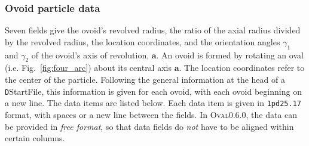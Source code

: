 \documentclass[letterpaper,11pt]{article}
\newcommand{\Oval}{\textsc{Oval}}
\begin{document}
\subsubsection{Ovoid particle data}\label{sec:ovoid_data}
Seven fields give the
ovoid's revolved radius, the ratio of the axial radius divided
by the revolved radius, the location coordinates, and the orientation
angles $\gamma_{1}$ and $\gamma_{2}$ of the ovoid's axis of revolution,
$\mathbf{a}$.
An ovoid is formed by rotating an oval (i.e. Fig.~\ref{fig:four_arc})
about its central axis $\mathbf{a}$.
The location coordinates refer to the center of the particle.
Following the general information at the head of a
\texttt{D}\textsf{StartFile}, this
information is given for each ovoid,
with each ovoid beginning on a new line.
The data items are listed below.
Each data item is given in \texttt{1pd25.17} format, with
spaces or a new line between the fields.
In \Oval0.6.0, the data can be provided in \emph{free format},
so that data fields do \emph{not} have to be aligned
within certain columns.
\end{document}
